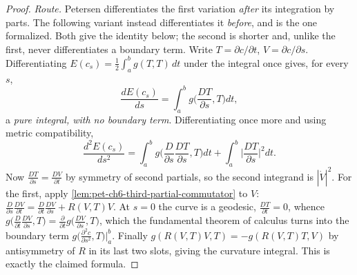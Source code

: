 \begin{proof}
  \emph{Route.} Petersen differentiates the first variation \emph{after} its
  integration by parts. The following variant instead differentiates it
  \emph{before}, and is the one formalized. Both give the identity below; the
  second is shorter and, unlike the first, never differentiates a boundary term.
  Write $T=\partial c/\partial t$, $V=\partial c/\partial s$. Differentiating
  $E(c_s)=\tfrac12\int_a^b g(T,T)\,dt$ under the integral once gives, for every
  $s$,
  \[
    \frac{dE(c_s)}{ds}=\int_a^b g\Big(\frac{D T}{\partial s},T\Big)dt,
  \]
  a \emph{pure integral, with no boundary term}. Differentiating once more and
  using metric compatibility,
  \[
    \frac{d^2E(c_s)}{ds^2}
    =\int_a^b g\Big(\frac{D}{\partial s}\frac{D T}{\partial s},T\Big)dt
     +\int_a^b\Big|\frac{D T}{\partial s}\Big|^2dt .
  \]
  Now $\frac{DT}{\partial s}=\frac{DV}{\partial t}$ by symmetry of second
  partials, so the second integrand is $|\dot V|^2$. For the first, apply
  \cref{lem:pet-ch6-third-partial-commutator} to $V$:
  $\frac{D}{\partial s}\frac{D V}{\partial t}
   =\frac{D}{\partial t}\frac{D V}{\partial s}+R(V,T)V$. At $s=0$ the curve is a
  geodesic, $\frac{DT}{\partial t}=0$, whence
  $g\big(\frac{D}{\partial t}\frac{DV}{\partial s},T\big)
   =\frac{\partial}{\partial t}g\big(\frac{DV}{\partial s},T\big)$, which the
  fundamental theorem of calculus turns into the boundary term
  $g\big(\frac{\partial^2c}{\partial s^2},T\big)\big|_a^b$. Finally
  $g(R(V,T)V,T)=-g(R(V,T)T,V)$ by antisymmetry of $R$ in its last two slots,
  giving the curvature integral. This is exactly the claimed formula.


\end{proof}
